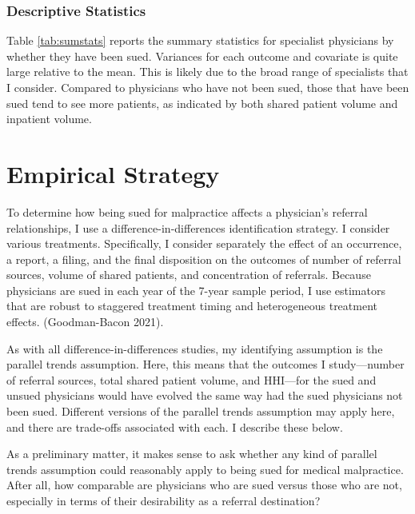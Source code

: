 \documentclass[
  12pt,
]{article}
\begin{document}
\hypertarget{descriptive-statistics}{%
\subsubsection{Descriptive Statistics}\label{descriptive-statistics}}

Table \ref{tab:sumstats} reports the summary statistics for specialist physicians by whether they have been sued. Variances for each outcome and covariate is quite large relative to the mean. This is likely due to the broad range of specialists that I consider. Compared to physicians who have not been sued, those that have been sued tend to see more patients, as indicated by both shared patient volume and inpatient volume.

\hypertarget{empirical-strategy}{%
\section{Empirical Strategy}\label{empirical-strategy}}

To determine how being sued for malpractice affects a physician's referral relationships, I use a difference-in-differences identification strategy. I consider various treatments. Specifically, I consider separately the effect of an occurrence, a report, a filing, and the final disposition on the outcomes of number of referral sources, volume of shared patients, and concentration of referrals. Because physicians are sued in each year of the 7-year sample period, I use estimators that are robust to staggered treatment timing and heterogeneous treatment effects. (Goodman-Bacon 2021).

As with all difference-in-differences studies, my identifying assumption is the parallel trends assumption. Here, this means that the outcomes I study---number of referral sources, total shared patient volume, and HHI---for the sued and unsued physicians would have evolved the same way had the sued physicians not been sued. Different versions of the parallel trends assumption may apply here, and there are trade-offs associated with each. I describe these below.

As a preliminary matter, it makes sense to ask whether any kind of parallel trends assumption could reasonably apply to being sued for medical malpractice. After all, how comparable are physicians who are sued versus those who are not, especially in terms of their desirability as a referral destination?
\end{document}
